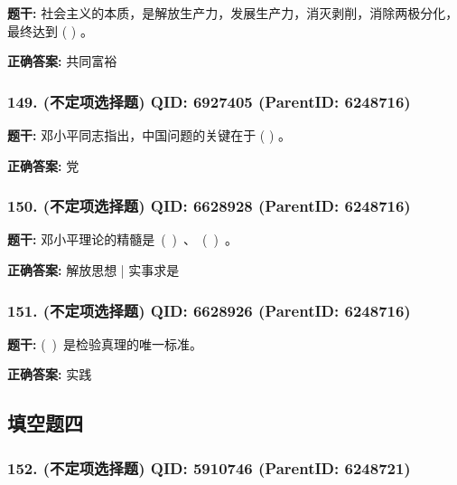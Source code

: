 \documentclass[12pt,UTF8]{ctexart}
\begin{document}
\textbf{题干:}
社会主义的本质，是解放生产力，发展生产力，消灭剥削，消除两极分化，最终达到 ( ) 。



\textbf{正确答案:}
共同富裕

\vspace{0.3em}\hrulefill\vspace{0.7em}

\subsubsection*{149. (不定项选择题) \small QID: 6927405 (ParentID: 6248716)}

\textbf{题干:}
邓小平同志指出，中国问题的关键在于 ( ) 。



\textbf{正确答案:}
党

\vspace{0.3em}\hrulefill\vspace{0.7em}

\subsubsection*{150. (不定项选择题) \small QID: 6628928 (ParentID: 6248716)}

\textbf{题干:}
邓小平理论的精髓是 ( ) 、 ( ) 。



\textbf{正确答案:}
解放思想 | 实事求是

\vspace{0.3em}\hrulefill\vspace{0.7em}

\subsubsection*{151. (不定项选择题) \small QID: 6628926 (ParentID: 6248716)}

\textbf{题干:}
( ) 是检验真理的唯一标准。



\textbf{正确答案:}
实践

\vspace{0.3em}\hrulefill\vspace{0.7em}

\subsection*{填空题四}

\subsubsection*{152. (不定项选择题) \small QID: 5910746 (ParentID: 6248721)}
\end{document}
